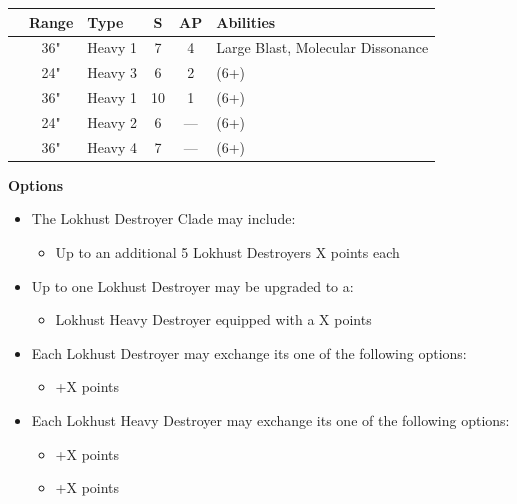\begin{minipage}[t]{0.72\textwidth}
	\begin{tabular}{L{90 pt} c C{40pt} *{2}{c} >{\raggedright\arraybackslash}p{130pt}}
		& Range & Type & S & AP & Abilities \\
		\hline
		 & 36" & Heavy 1 & 7 & 4 & Large Blast, Molecular Dissonance \\
		 & 24" & Heavy 3 & 6 & 2 &  (6+) \\
		 & 36" & Heavy 1 & 10 & 1 &   (6+) \\
		 & 24" & Heavy 2 & 6 & — &  (6+) \\
		 & 36" & Heavy 4 & 7 & — &   (6+) \\
	\end{tabular}
	
	\vspace*{2em}
	\textbf{Options}
	\begin{itemize}
		\item The Lokhust Destroyer Clade may include:
		\begin{itemize}
			\item Up to an additional 5 Lokhust Destroyers \dotfill X points each
		\end{itemize}
		\item Up to one Lokhust Destroyer may be upgraded to a:
		\begin{itemize}
			\item Lokhust Heavy Destroyer equipped with a  \dotfill X points
		\end{itemize}
		\item Each Lokhust Destroyer may exchange its  one of the following options:
		\begin{itemize}
			\item {} \dotfill +X points
		\end{itemize}
		\item Each Lokhust Heavy Destroyer may exchange its  one of the following options:
		\begin{itemize}
			\item {} \dotfill +X points
			\item {} \dotfill +X points
		\end{itemize}
	\end{itemize}
\end{minipage}
\hspace{0.5em}


